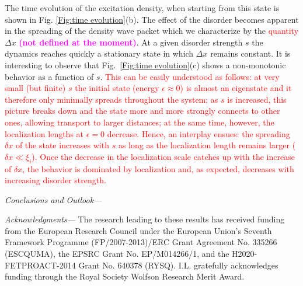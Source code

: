 \documentclass[prl,aps,twocolumn,showpacs,superscriptaddress,longbibliography]{revtex4-1}
\newcommand{\changer}[1]{\textcolor{red}{#1}}
\newcommand{\tochange}[1]{\textcolor{magenta}{#1}}
\newcommand{\mm}[1]{{\tochange{\footnotesize{\bf (#1)}}}}
\begin{document}

The time evolution of the excitation density, when starting from this state is shown in Fig. \ref{Fig:time evolution}(b). The effect of the disorder becomes apparent in the spreading of the density wave packet which we characterize by the \changer{quantity} $\Delta x$ \mm{not defined at the moment}. At a given disorder strength $s$ the dynamics reaches quickly a stationary state in which $\Delta x$ remains constant. It is interesting to observe that Fig.~\ref{Fig:time evolution}(c) shows a non-monotonic behavior as a function of $s$. \changer{This can be easily understood as follows: at very small (but finite) $s$ the initial state (energy $\epsilon \approx 0$) is almost an eigenstate and it therefore only minimally spreads throughout the system; as $s$ is increased, this picture breaks down and the state more and more strongly connects to other ones, allowing transport to larger distances; at the same time, however, the localization lengths at $\epsilon = 0$ decrease. Hence, an interplay ensues: the spreading $\delta x$ of the state increases with $s$ as long as the localization length remains larger ($\delta x \ll \xi_i$). Once the decrease in the localization scale catches up with the increase of $\delta x$, the behavior is dominated by localization and, as expected, decreases with increasing disorder strength.   }


\emph{Conclusions and Outlook---}

\emph{Acknowledgments---} The research  leading  to  these  results  has  received  funding  from the European Research Council under the European Union’s Seventh Framework Programme (FP/2007-2013)/ERC Grant Agreement No.
335266 (ESCQUMA), the EPSRC Grant No. EP/M014266/1, and the H2020-FETPROACT-2014 Grant No. 640378 (RYSQ). I.L. gratefully acknowledges funding through the Royal Society Wolfson Research Merit Award. 




\end{document}
